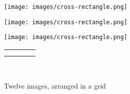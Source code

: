 \documentclass[10pt,]{article}
\theoremstyle{plain}
\theoremstyle{definition}
\theoremstyle{definition}
\theoremstyle{definition}
\theoremstyle{definition}
\theoremstyle{definition}
\theoremstyle{definition}
\numberwithin{equation}{section}
\newlength{\panelmax}
\begin{document}
\begin{figure}
{\begin{lrbox}{\panelboxBimage}
\texttt{[image: images/cross-rectangle.png]}
\end{lrbox}
\ifdefined\phBimage\else\newlength{\phBimage}\fi%
\setlength{\phBimage}{\ht\panelboxBimage+\dp\panelboxBimage}
\settototalheight{\phBimage}{\usebox{\panelboxBimage}}
\setlength{\panelmax}{\maxof{\panelmax}{\phBimage}}
\ifdefined\panelboxCimage\else\newsavebox{\panelboxCimage}\fi%
\begin{lrbox}{\panelboxCimage}
\texttt{[image: images/cross-rectangle.png]}
\end{lrbox}
\ifdefined\phCimage\else\newlength{\phCimage}\fi%
\setlength{\phCimage}{\ht\panelboxCimage+\dp\panelboxCimage}
\settototalheight{\phCimage}{\usebox{\panelboxCimage}}
\setlength{\panelmax}{\maxof{\panelmax}{\phCimage}}
\ifdefined\panelboxDimage\else\newsavebox{\panelboxDimage}\fi%
\begin{lrbox}{\panelboxDimage}
\texttt{[image: images/cross-rectangle.png]}
\end{lrbox}
\ifdefined\phDimage\else\newlength{\phDimage}\fi%
\setlength{\phDimage}{\ht\panelboxDimage+\dp\panelboxDimage}
\settototalheight{\phDimage}{\usebox{\panelboxDimage}}
\setlength{\panelmax}{\maxof{\panelmax}{\phDimage}}
\leavevmode%
\setlength{\tabcolsep}{0.025\linewidth}
\par\medskip\noindent
\hspace*{0.025\linewidth}%
\begin{tabular}{@{}*{4}{c}@{}}
\begin{minipage}[c][\panelmax][t]{0.2\linewidth}\usebox{\panelboxAimage}\end{minipage}&
\begin{minipage}[c][\panelmax][t]{0.2\linewidth}\usebox{\panelboxBimage}\end{minipage}&
\begin{minipage}[c][\panelmax][t]{0.2\linewidth}\usebox{\panelboxCimage}\end{minipage}&
\begin{minipage}[c][\panelmax][t]{0.2\linewidth}\usebox{\panelboxDimage}\end{minipage}\tabularnewline
\parbox[t]{0.2\linewidth}{\subcaption{\label{figure-97}}
}&
\parbox[t]{0.2\linewidth}{\subcaption{\label{figure-98}}
}&
\parbox[t]{0.2\linewidth}{\subcaption{\label{figure-99}}
}&
\parbox[t]{0.2\linewidth}{\subcaption{\label{figure-100}}
}\end{tabular}\\
}%
\caption{Twelve images, arranged in a grid\label{figure-88}}
\end{figure}
\end{document}

